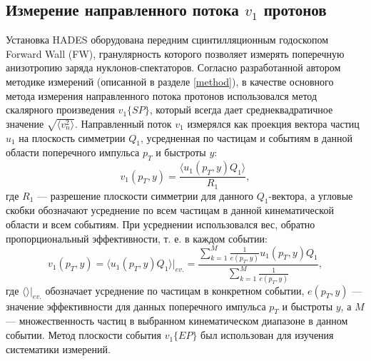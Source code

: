 \subsection{Измерение направленного потока $v_1$ протонов \label{hadesflow} }

Установка HADES оборудована передним  сцинтилляционным годоскопом Forward Wall (FW), гранулярность которого позволяет измерять поперечную анизотропию заряда нуклонов-спектаторов. 
Согласно разработанной автором методике измерений (описанной в разделе \ref{method}), в качестве основного метода измерения направленного потока протонов использовался метод скалярного произведения $v_1\{SP\}$, который всегда дает среднеквадратичное значение  $\sqrt{ \langle v_n^2 \rangle }$. 
Направленный поток $v_1$  измерялся как проекция вектора частиц $u_1$ на плоскость симметрии $Q_1$, усредненная по частицам и событиям в данной области поперечного импульса $p_T$ и быстроты $y$:
%
\begin{equation}
  v_1(p_T, y) = \frac{ \langle u_1(p_T, y) Q_1 \rangle }{ R_1 },
\end{equation}
%
где $R_1$ --- разрешение плоскости симметрии для данного $Q_1$-вектора, а угловые скобки обозначают усреднение по всем частицам в данной кинематической области и всем событиям.
При усреднении использовался вес, обратно пропорциональный эффективности, т. е. в каждом событии:
\begin{equation}
    v_1(p_T, y) = \langle u_1(p_T, y) Q_1 \rangle |_{ev.}  = \frac{ \sum_{k=1}^M \frac{1}{ e(p_T, y) } u_1( p_T, y ) Q_1 }{ \sum_{k=1}^M \frac{1}{ e(p_T, y) } },
\end{equation}
где $\langle \rangle |_{ev.}$ обозначает усреднение по частицам в конкретном событии, $e(p_T, y)$ --- значение эффективности для данных поперечного импульса $p_T$ и быстроты $y$, а $M$ --- множественность частиц в выбранном кинематическом диапазоне в данном событии.
Метод плоскости события $v_1\{EP\}$ был использован для изучения систематики измерений.  

